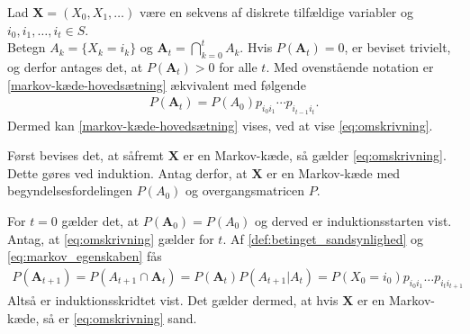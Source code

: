 \begin{bev} \textbf{}
\newline
Lad $\bm X = (X_0, X_1, \dots)$ være en sekvens af diskrete tilfældige variabler og $i_0, i_1, \dots, i_t \in S$. \\
Betegn $A_k = \{X_k = i_k\}$ og $\bm A_t=\bigcap_{k=0}^t A_k$. Hvis $P(\bm A_t)=0$, er beviset trivielt, og derfor antages det, at $P(\bm A_t)>0$ for alle $t$. 
Med ovenstående notation er \eqref{markov-kæde-hovedsætning} ækvivalent med følgende
\begin{align}\label{eq:omskrivning}
    P(\bm A_t)=P(A_0)p_{i_0i_1}\cdots p_{i_{t-1}i_t}.
\end{align}
Dermed kan \eqref{markov-kæde-hovedsætning} vises, ved at vise \eqref{eq:omskrivning}.

Først bevises det, at såfremt $\bm X$ er en Markov-kæde, så gælder \eqref{eq:omskrivning}. Dette gøres ved induktion.
Antag derfor, at $\bm X$ er en Markov-kæde med begyndelsesfordelingen $P(A_0)$ og overgangsmatricen $P$. 

For $t=0$ gælder det, at $P(\bm A_0) = P(A_0)$ og derved er induktionsstarten vist. Antag, at \eqref{eq:omskrivning} gælder for $t$. Af \autoref{def:betinget_sandsynlighed} og \eqref{eq:markov_egenskaben} fås
%
\begin{align*}
     P(\bm A_{t+1}) = P(A_{t+1}\cap \bm A_{t})= P(\bm A_{t})P(A_{t+1}| A_t)=P(X_0=i_0)p_{i_0i_1}\dots p_{i_{t}i_{t+1}}
\end{align*}
Altså er induktionsskridtet vist. Det gælder dermed, at hvis $\bm X$ er en Markov-kæde, så er \eqref{eq:omskrivning} sand.  



\end{bev}
